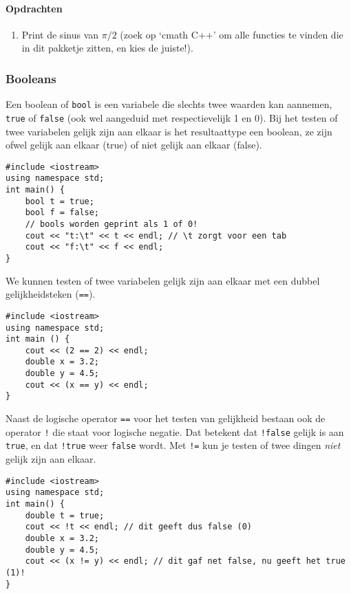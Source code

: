\documentclass[12pt,a4paper]{article}
\newcommand{\icode}{\lstinline}
\begin{document}
\paragraph{Opdrachten}
\begin{enumerate} 
\item 
Print de sinus van $\pi/2$ (zoek op `cmath C++’ om alle functies te vinden die in dit 
pakketje zitten, en kies de juiste!). 
\end{enumerate} 
\subsubsection{Booleans}
Een boolean of \icode{bool} is een variabele die slechts twee waarden kan aannemen, \icode{true} of 
\icode{false} (ook wel aangeduid met respectievelijk 1 en 0). Bij het testen of twee variabelen gelijk 
zijn aan elkaar is het resultaattype een boolean, ze zijn ofwel gelijk aan elkaar (true) of niet gelijk aan 
elkaar (false).
\begin{lstlisting}
#include <iostream> 
using namespace std; 
int main() {
	bool t = true;
	bool f = false; 
	// bools worden geprint als 1 of 0! 
	cout << "t:\t" << t << endl; // \t zorgt voor een tab
	cout << "f:\t" << f << endl; 
}
\end{lstlisting}

We kunnen testen of twee variabelen gelijk zijn aan elkaar met een dubbel gelijkheidsteken (\icode{==}). 
\begin{lstlisting}
#include <iostream> 
using namespace std;
int main () {
	cout << (2 == 2) << endl; 
	double x = 3.2; 
	double y = 4.5; 
	cout << (x == y) << endl; 
}
\end{lstlisting}
Naast de logische operator \icode{==} voor het testen van gelijkheid bestaan ook de operator \icode{!} die staat voor 
logische negatie. Dat betekent dat \icode{!false} gelijk is aan \icode{true}, en dat \icode{!true} weer \icode{false} wordt.
Met \icode{!=} kun je testen of twee dingen \emph{niet} gelijk zijn aan elkaar. 
\begin{lstlisting}
#include <iostream> 
using namespace std; 
int main() {
	double t = true; 
	cout << !t << endl; // dit geeft dus false (0) 
	double x = 3.2; 
	double y = 4.5; 
	cout << (x != y) << endl; // dit gaf net false, nu geeft het true (1)! 
}
\end{lstlisting}
\end{document}
